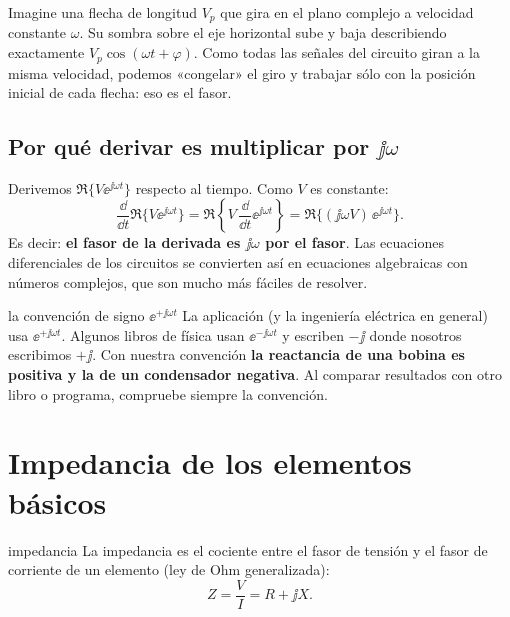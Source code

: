 \begin{intuicion}
Imagine una flecha de longitud $V_p$ que gira en el plano complejo a velocidad constante $\omega$. Su sombra sobre el eje horizontal
sube y baja describiendo exactamente $V_p\cos(\omega t + \varphi)$. Como todas las señales del circuito giran a la misma
velocidad, podemos «congelar» el giro y trabajar sólo con la posición inicial de cada flecha: eso es el fasor.
\end{intuicion}

\subsection{\texorpdfstring{Por qué derivar es multiplicar por $\jj\omega$}{Por qué derivar es multiplicar por jω}}
Derivemos $\Re\{V\ee^{\jj\omega t}\}$ respecto al tiempo. Como $V$ es constante:
\begin{equation}
  \frac{\dd}{\dd t}\Re\{V\ee^{\jj\omega t}\} = \Re\left\{V\,\frac{\dd}{\dd t}\ee^{\jj\omega t}\right\} = \Re\{(\jj\omega V)\,\ee^{\jj\omega t}\}.
\end{equation}
Es decir: \textbf{el fasor de la derivada es $\jj\omega$ por el fasor}. Las ecuaciones diferenciales de los circuitos
se convierten así en ecuaciones algebraicas con números complejos, que son mucho más fáciles de resolver.

\begin{atencion}{la convención de signo $\ee^{+\jj\omega t}$}
La aplicación (y la ingeniería eléctrica en general) usa $\ee^{+\jj\omega t}$. Algunos libros de física usan $\ee^{-\jj\omega t}$ y
escriben $-\jj$ donde nosotros escribimos $+\jj$. Con nuestra convención \textbf{la reactancia de una bobina es positiva y la de un
condensador negativa}. Al comparar resultados con otro libro o programa, compruebe siempre la convención.
\end{atencion}

\section{Impedancia de los elementos básicos}

\begin{definicion}{impedancia}
La impedancia es el cociente entre el fasor de tensión y el fasor de corriente de un elemento (ley de Ohm generalizada):
\begin{equation}
  Z = \frac{V}{I} = R + \jj X .
\end{equation}
\begin{donde}
\end{donde}
\end{definicion}

